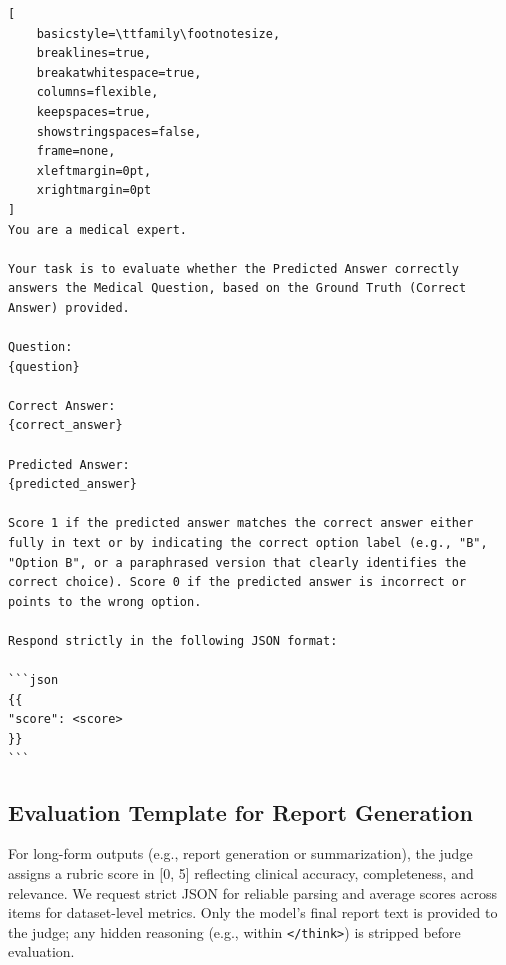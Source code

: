 \documentclass{article}
\theoremstyle{plain}
\theoremstyle{definition}
\theoremstyle{remark}
\begin{document}
\begin{tcolorbox}[
    colback=gray!3!white, 
    colframe=gray!30!black, 
    arc=3mm, 
    boxrule=0.5pt, 
    breakable, 
    left=4mm,
    right=4mm,
    top=3mm,
    bottom=3mm,
    title={\textbf{Evaluation BASE template Prompt}},
    fonttitle=\bfseries\color{white}
]
\footnotesize
\begin{lstlisting}[
    basicstyle=\ttfamily\footnotesize,
    breaklines=true,
    breakatwhitespace=true,
    columns=flexible,
    keepspaces=true,
    showstringspaces=false,
    frame=none,
    xleftmargin=0pt,
    xrightmargin=0pt
]
You are a medical expert.

Your task is to evaluate whether the Predicted Answer correctly answers the Medical Question, based on the Ground Truth (Correct Answer) provided.

Question:
{question}

Correct Answer:
{correct_answer}

Predicted Answer:
{predicted_answer}

Score 1 if the predicted answer matches the correct answer either fully in text or by indicating the correct option label (e.g., "B", "Option B", or a paraphrased version that clearly identifies the correct choice). Score 0 if the predicted answer is incorrect or points to the wrong option.

Respond strictly in the following JSON format:

```json
{{
"score": <score>
}}
```

\end{lstlisting}
\end{tcolorbox}

\subsection{Evaluation Template for Report Generation}
\label{app:eval-report}

For long-form outputs (e.g., report generation or summarization), the judge assigns a rubric score in [0, 5] reflecting clinical accuracy, completeness, and relevance. We request strict JSON for reliable parsing and average scores across items for dataset-level metrics. Only the model’s final report text is provided to the judge; any hidden reasoning (e.g., within \texttt{</think>}) is stripped before evaluation.
\end{document}
